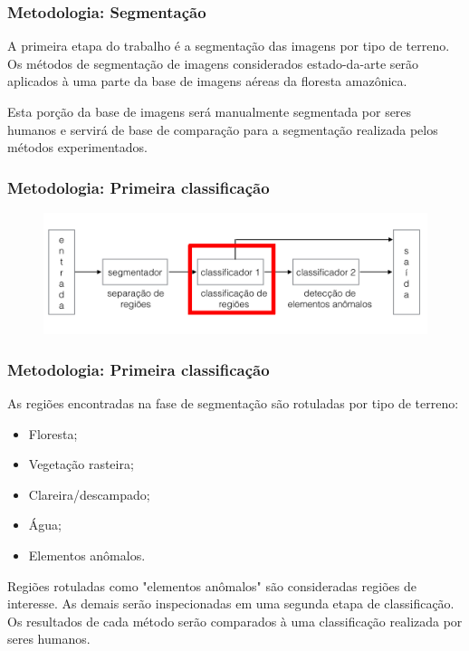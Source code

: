 \documentclass[t]{beamer}
\begin{document}
\begin{frame}
	\frametitle{Metodologia: Segmentação}

	A primeira etapa do trabalho é a segmentação das imagens por tipo de terreno. Os métodos de segmentação de imagens considerados estado-da-arte serão aplicados à uma parte da base de imagens aéreas da floresta amazônica. 
	
	\vspace{0.5cm}
	
	Esta porção da base de imagens será manualmente segmentada por seres humanos e servirá de base de comparação para a segmentação realizada pelos métodos experimentados.

\end{frame}

\begin{frame}[c]
	\frametitle{Metodologia: Primeira classificação}
	\begin{figure}[h]
    	\includegraphics[width=\textwidth]{imgs/arquitetura_2}
	\end{figure}
\end{frame}

\begin{frame}
	\frametitle{Metodologia: Primeira classificação}

	As regiões encontradas na fase de segmentação são rotuladas por tipo de terreno:

	\begin{itemize}
		\item Floresta;
		\item Vegetação rasteira;
		\item Clareira/descampado;
		\item Água;
		\item Elementos anômalos.
	\end{itemize}

	\vspace{0.5cm}

	Regiões rotuladas como "elementos anômalos" são consideradas regiões de interesse. As demais serão inspecionadas em uma segunda etapa de classificação. Os resultados de cada método serão comparados à uma classificação realizada por seres humanos.

\end{frame}
\end{document}
